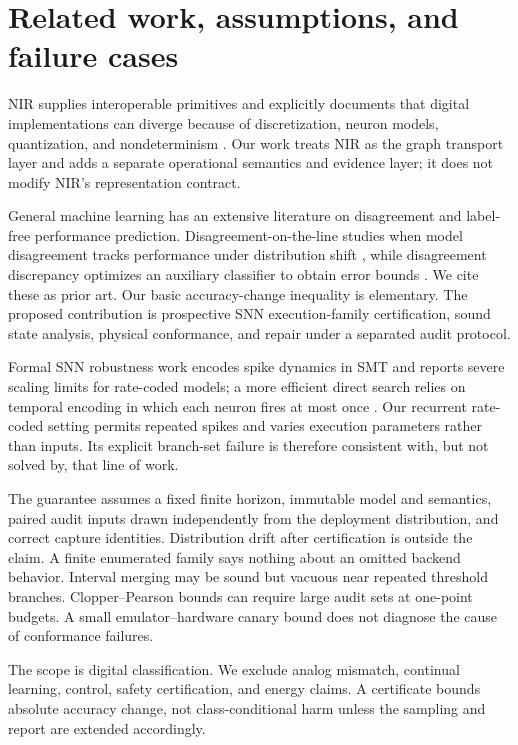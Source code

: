 \section{Related work, assumptions, and failure cases}

NIR supplies interoperable primitives and explicitly documents that digital
implementations can diverge because of discretization, neuron models,
quantization, and nondeterminism \citep{pedersen2024nir}. Our work treats NIR as
the graph transport layer and adds a separate operational semantics and evidence
layer; it does not modify NIR's representation contract.

General machine learning has an extensive literature on disagreement and
label-free performance prediction. Disagreement-on-the-line studies when model
disagreement tracks performance under distribution shift \citep{lee2023dotl},
while disagreement discrepancy optimizes an auxiliary classifier to obtain error
bounds \citep{rosenfeld2023disagreement}. We cite these as prior art. Our basic
accuracy-change inequality is elementary. The proposed contribution is prospective
SNN execution-family certification, sound state analysis, physical conformance,
and repair under a separated audit protocol.

Formal SNN robustness work encodes spike dynamics in SMT and reports severe
scaling limits for rate-coded models; a more efficient direct search relies on
temporal encoding in which each neuron fires at most once
\citep{seong2024verification}. Our recurrent rate-coded setting permits repeated
spikes and varies execution parameters rather than inputs. Its explicit
branch-set failure is therefore consistent with, but not solved by, that line of
work.

The guarantee assumes a fixed finite horizon, immutable model and semantics,
paired audit inputs drawn independently from the deployment distribution, and
correct capture identities. Distribution drift after certification is outside
the claim. A finite enumerated family says nothing about an omitted backend
behavior. Interval merging may be sound but vacuous near repeated threshold
branches. Clopper--Pearson bounds can require large audit sets at one-point
budgets. A small emulator--hardware canary bound does not diagnose the cause of
conformance failures.

The scope is digital classification. We exclude analog mismatch, continual
learning, control, safety certification, and energy claims. A certificate bounds
absolute accuracy change, not class-conditional harm unless the sampling and
report are extended accordingly.
